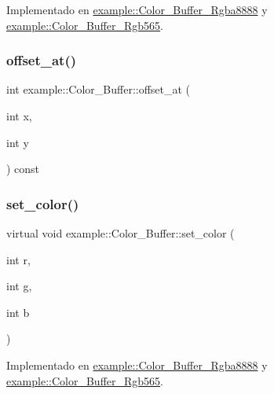 Implementado en \mbox{\hyperlink{classexample_1_1_color___buffer___rgba8888_a66e133b6fd196f02a0ba454dd3fc550f}{example\+::\+Color\+\_\+\+Buffer\+\_\+\+Rgba8888}} y \mbox{\hyperlink{classexample_1_1_color___buffer___rgb565_a990c8e8f928b672ab82f7364b12eadb2}{example\+::\+Color\+\_\+\+Buffer\+\_\+\+Rgb565}}.

\mbox{\label{classexample_1_1_color___buffer_ae316a2df43a9ead02cc45170a8d0f7ed}} 
\subsubsection{\texorpdfstring{offset\_at()}{offset\_at()}}
{\footnotesize\ttfamily int example\+::\+Color\+\_\+\+Buffer\+::offset\+\_\+at (\begin{DoxyParamCaption}\item[{int}]{x,  }\item[{int}]{y }\end{DoxyParamCaption}) const\hspace{0.3cm}{\ttfamily [inline]}}

\mbox{\label{classexample_1_1_color___buffer_a3fbfa949ee340ccdb40ad0ce8339b827}} 
\subsubsection{\texorpdfstring{set\_color()}{set\_color()}}
{\footnotesize\ttfamily virtual void example\+::\+Color\+\_\+\+Buffer\+::set\+\_\+color (\begin{DoxyParamCaption}\item[{int}]{r,  }\item[{int}]{g,  }\item[{int}]{b }\end{DoxyParamCaption})\hspace{0.3cm}{\ttfamily [pure virtual]}}



Implementado en \mbox{\hyperlink{classexample_1_1_color___buffer___rgba8888_a408bf6adf54fc9958b74d21c8f6da178}{example\+::\+Color\+\_\+\+Buffer\+\_\+\+Rgba8888}} y \mbox{\hyperlink{classexample_1_1_color___buffer___rgb565_ac38babd86731bf63703875706b0138c6}{example\+::\+Color\+\_\+\+Buffer\+\_\+\+Rgb565}}.

